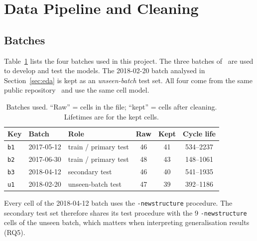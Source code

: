 \section{Data Pipeline and Cleaning}
\label{sec:pipeline}

\subsection{Batches}
Table~\ref{tab:batches} lists the four batches used in this project. The
three batches of~\cite{severson2019} are used to develop and test the models.
The 2018-02-20 batch analysed in Section~\ref{sec:eda} is kept as an
\emph{unseen-batch} test set. All four come from the same public
repository~\cite{matr_data} and use the same cell model.

\begin{table}[t]
\centering
\caption{Batches used. ``Raw'' = cells in the file; ``kept'' = cells after
cleaning. Lifetimes are for the kept cells.}
\label{tab:batches}
\setlength{\tabcolsep}{3pt}
\begin{tabular}{@{}lllccc@{}}
\toprule
Key & Batch & Role & Raw & Kept & Cycle life \\
\midrule
\texttt{b1} & 2017-05-12 & train / primary test & 46 & 41 & 534--2237 \\
\texttt{b2} & 2017-06-30 & train / primary test & 48 & 43 & 148--1061 \\
\texttt{b3} & 2018-04-12 & secondary test       & 46 & 40 & 541--1935 \\
\texttt{u1} & 2018-02-20 & unseen-batch test    & 47 & 39 & 392--1186 \\
\bottomrule
\end{tabular}
\end{table}

Every cell of the 2018-04-12 batch uses the \texttt{-newstructure}
procedure. The secondary test set therefore shares its test procedure with
the 9 \texttt{-newstructure} cells of the unseen batch, which matters when
interpreting generalisation results (RQ5).

